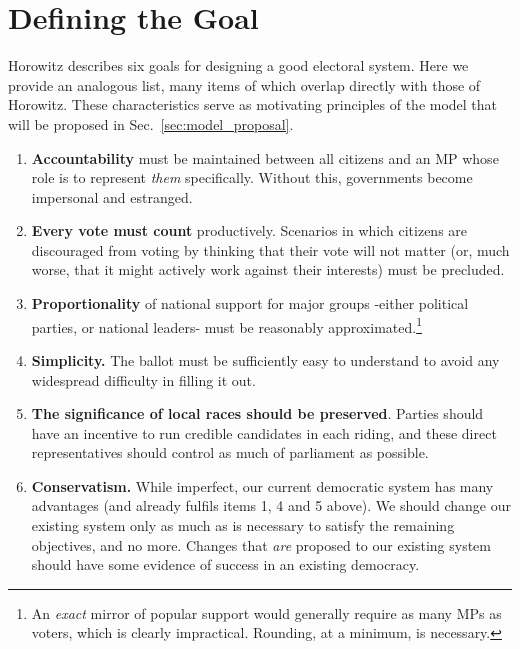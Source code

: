 \section{Defining the Goal}
\label{sec:goal_list}

Horowitz describes six goals for designing a good electoral system\cite{horowitz}. Here we provide an analogous list, many items of which overlap directly with those of Horowitz. These characteristics serve as motivating principles of the model that will be proposed in Sec.~\ref{sec:model_proposal}.
\begin{enumerate}
\item \textbf{Accountability} must be maintained between all citizens and an MP whose role is to represent \emph{them} specifically. Without this, governments become impersonal and estranged.
\item \textbf{Every vote must count} productively. Scenarios in which citizens are discouraged from voting by thinking that their vote will not matter (or, much worse, that it might actively work against their interests) must be precluded.
\item \textbf{Proportionality} of national support for major groups \--either political parties, or national leaders\-- must be reasonably approximated.\footnote{
An \emph{exact} mirror of popular support would generally require as many MPs as voters, which is clearly impractical. Rounding, at a minimum, is necessary.
}
\item   \textbf{Simplicity.} The ballot must be sufficiently easy to understand to avoid any widespread difficulty in filling it out.

\item  \textbf{The significance of local races should be preserved}. Parties should have an incentive to run credible candidates in each riding, and these direct representatives should control as much of parliament as possible.
\item \textbf{Conservatism.} While imperfect, our current democratic system has many advantages (and already fulfils items 1, 4 and 5 above). We should change our existing system only as much as is necessary to satisfy the remaining objectives, and no more. Changes that \emph{are} proposed to our existing system should have some evidence of success in an existing democracy.
\end{enumerate}

